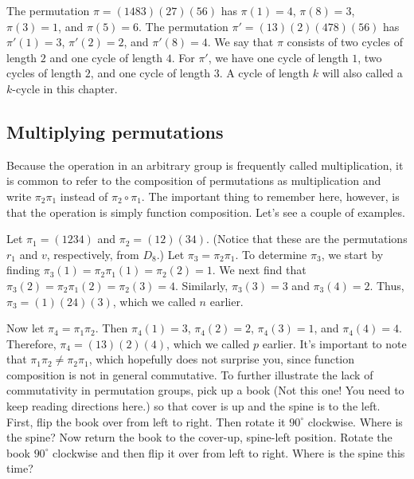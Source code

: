 \begin{example}
  The permutation $\pi=(1483)(27)(56)$ has $\pi(1)=4$,
  $\pi(8)=3$, $\pi(3)=1$, and $\pi(5)=6$. The permutation
  $\pi'=(13)(2)(478)(56)$ has $\pi'(1)=3$, $\pi'(2) = 2$, and
  $\pi'(8)=4$. We say that $\pi$ consists of two cycles of length $2$
  and one cycle of length $4$. For $\pi'$, we have one cycle of length
  $1$, two cycles of length $2$, and one cycle of length $3$. A cycle
  of length $k$ will also called a $k$-cycle in this chapter.
\end{example}

\subsection{Multiplying permutations}\label{ss:polya:perm-groups:mult}

Because the operation in an arbitrary group is frequently called
multiplication, it is common to refer to the composition of
permutations as multiplication and write $\pi_2\pi_1$ instead of
$\pi_2\circ \pi_1$. The important thing to remember here, however, is
that the operation is simply function composition. Let's see a couple
of examples.

\begin{example}
  Let $\pi_1 = (1234)$ and $\pi_2 = (12)(34)$. (Notice that these are
  the permutations $r_1$ and $v$, respectively, from $D_8$.) Let
  $\pi_3=\pi_2\pi_1$. To determine $\pi_3$, we start by finding
  $\pi_3(1) = \pi_2\pi_1(1) = \pi_2(2) = 1$. We next find that
  $\pi_3(2) = \pi_2\pi_1(2) = \pi_2(3)=4$. Similarly, $\pi_3(3) = 3$
  and $\pi_3(4)=2$. Thus, $\pi_3=(1)(24)(3)$, which we called $n$
  earlier.

  Now let $\pi_4 = \pi_1\pi_2$. Then $\pi_4(1) = 3$, $\pi_4(2)=2$,
  $\pi_4(3)=1$, and $\pi_4(4)=4$. Therefore, $\pi_4=(13)(2)(4)$, which
  we called $p$ earlier. It's important to note that $\pi_1\pi_2\neq
  \pi_2\pi_1$, which hopefully does not surprise you, since function
  composition is not in general commutative. To further illustrate the
  lack of commutativity in permutation groups, pick up a book (Not
  this one! You need to keep reading directions here.) so that
  cover is up and the spine is to the left. First, flip the book over
  from left to right. Then rotate it $90^\circ$
  clockwise. Where is the spine? Now return the book to the cover-up,
  spine-left position. Rotate the book $90^\circ$ clockwise and then
  flip it over from left to right. Where is the spine this time?
  \end{example}

